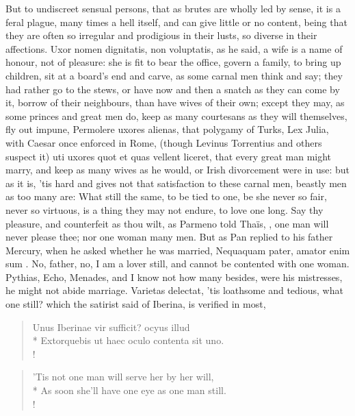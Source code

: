 But to undiscreet sensual persons, that as brutes are wholly led by
sense, it is a feral plague, many times a hell itself, and can give
little or no content, being that they are often so irregular and
prodigious in their lusts, so diverse in their affections. Uxor nomen
dignitatis, non voluptatis, as he said, a wife is a name of
honour, not of pleasure: she is fit to bear the office, govern a
family, to bring up children, sit at a board's end and carve, as some
carnal men think and say; they had rather go to the stews, or have now
and then a snatch as they can come by it, borrow of their neighbours,
than have wives of their own; except they may, as some princes and
great men do, keep as many courtesans as they will themselves, fly out
impune, Permolere uxores alienas, that polygamy of Turks, Lex
Julia, with Caesar once enforced in Rome, (though Levinus Torrentius
and others suspect it) uti uxores quot et quas vellent liceret, that
every great man might marry, and keep as many wives as he would, or
Irish divorcement were in use: but as it is, 'tis hard and gives not
that satisfaction to these carnal men, beastly men as too many are:
What still the same, to be tied to one, be she never so
fair, never so virtuous, is a thing they may not endure, to love one
long. Say thy pleasure, and counterfeit as thou wilt, as Parmeno
told Thaïs, , one man will never please thee;
nor one woman many men. But as Pan replied to his father Mercury,
when he asked whether he was married, Nequaquam pater, amator enim sum
\etc{}. No, father, no, I am a lover still, and cannot be contented with
one woman. Pythias, Echo, Menades, and I know not how many besides,
were his mistresses, he might not abide marriage. Varietas delectat,
'tis loathsome and tedious, what one still? which the satirist said of
Iberina, is verified in most,

\begin{latin}
\begin{verse}%
Unus Iberinae vir sufficit? ocyus illud\\*
Extorquebis ut haec oculo contenta sit uno.\\!
\end{verse}%
\end{latin}
\translationrule%
\begin{verse}
'Tis not one man will serve her by her will,\\*
As soon she'll have one eye as one man still.\\!
\end{verse}
%

